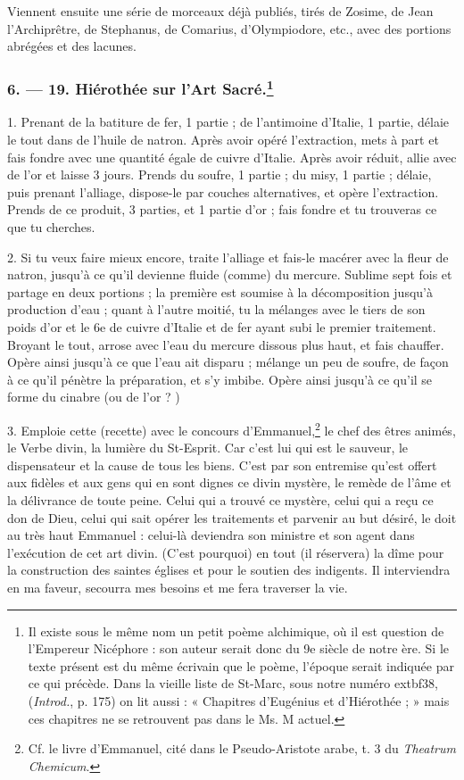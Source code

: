 \documentclass[a4paper, 11pt, oneside, polutonikogreek, french]{article}
\begin{document}
Viennent ensuite une série de morceaux déjà publiés, tirés de Zosime, de Jean l'Archiprêtre, de Stephanus, de Comarius, d'Olympiodore, etc., avec des portions abrégées et des lacunes.

\bigskip
\centerline{\EightStarTaper}
\centerline{\EightStarTaper\EightStarTaper}
\bigskip

\subsubsection[6. --- 19. Hiérothée sur l'Art Sacré.]{6. --- 19. Hiérothée sur l'Art Sacré.\footnote{Il existe sous le même nom un petit poème alchimique, où il est question de l'Empereur Nicéphore : son auteur serait donc du 9e siècle de notre ère. Si le texte présent est du même écrivain que le poème, l'époque serait indiquée par ce qui précède. Dans la vieille liste de St-Marc, sous notre numéro 	extbf{38}, (\emph{Introd.}, p. 175) on lit aussi : « Chapitres d'Eugénius et d'Hiérothée ; » mais ces chapitres ne se retrouvent pas dans le Ms. M actuel.}}

1. Prenant de la batiture de fer, 1 partie ; de l'antimoine d'Italie, 1 partie, délaie le tout dans de l'huile de natron. Après avoir opéré l'extraction, mets à part et fais fondre avec une quantité égale de cuivre d'Italie. Après avoir réduit, allie avec de l'or et laisse 3 jours. Prends du soufre, 1 partie ; du misy, 1 partie ; délaie, puis prenant l'alliage, dispose-le par couches alternatives, et opère l'extraction. Prends de ce produit, 3 parties, et 1 partie d'or ; fais fondre et tu trouveras ce que tu cherches.

2. Si tu veux faire mieux encore, traite l'alliage et fais-le macérer avec la fleur de natron, jusqu'à ce qu'il devienne fluide (comme) du mercure. Sublime sept fois et partage en deux portions ; la première est soumise à la décomposition jusqu'à production d'eau ; quant à l'autre moitié, tu la mélanges avec le tiers de son poids d'or et le 6e de cuivre d'Italie et de fer ayant subi le premier traitement. Broyant le tout, arrose avec l'eau du mercure dissous plus haut, et fais chauffer. Opère ainsi jusqu'à ce que l'eau ait disparu ; mélange un peu de soufre, de façon à ce qu'il pénètre la préparation, et s'y imbibe. Opère ainsi jusqu'à ce qu'il se forme du cinabre (ou de l'or ? )

3. Emploie cette (recette) avec le concours d'Emmanuel,\footnote{Cf. le livre d'Emmanuel, cité dans le Pseudo-Aristote arabe, t. 3 du \emph{Theatrum Chemicum}.} le chef des êtres animés, le Verbe divin, la lumière du St-Esprit. Car c'est lui qui est le sauveur, le dispensateur et la cause de tous les biens. C'est par son entremise qu'est offert aux fidèles et aux gens qui en sont dignes ce divin mystère, le remède de l'âme et la délivrance de toute peine. Celui qui a trouvé ce mystère, celui qui a reçu ce don de Dieu, celui qui sait opérer les traitements et parvenir au but désiré, le doit au très haut Emmanuel : celui-là deviendra son ministre et son agent dans l'exécution de cet art divin. (C'est pourquoi) en tout (il réservera) la dîme pour la construction des saintes églises et pour le soutien des indigents. Il interviendra en ma faveur, secourra mes besoins et me fera traverser la vie.
\end{document}
